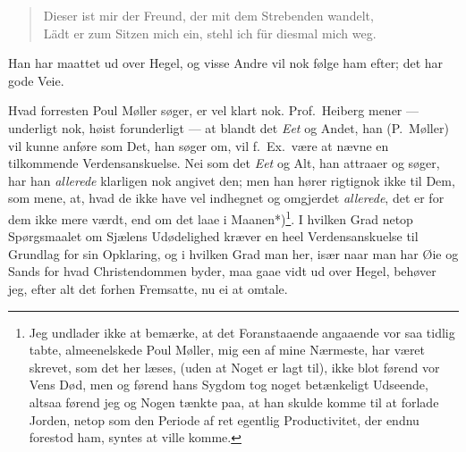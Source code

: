 \documentclass[12pt,a4paper]{book}
\newcommand{\apage}[1]{\marginnote{\footnotesize\textit{[#1]}}}
\begin{document}
\begin{quote}
Dieser ist mir der Freund, der mit dem Strebenden wandelt,\\
\quad Lädt er zum Sitzen mich ein, stehl ich für diesmal mich weg.
\end{quote}

\noindent Han har maattet ud over Hegel, og visse Andre vil nok følge
ham efter; det har gode Veie.

Hvad forresten Poul Møller søger, er vel klart nok. Prof.\ Heiberg
mener --- underligt nok, høist forunderligt --- at blandt det \emph{Eet} og
Andet, han (P.\ Møller) vil kunne anføre som Det, han søger om, vil f.\
Ex.\ være at nævne en tilkommende Verdensanskuelse. Nei som det \emph{Eet} og
Alt, han attraaer og søger, har han \emph{allerede} klarligen nok angivet den;
men han hører \apage{55} rigtignok ikke til Dem, som mene, at, hvad de ikke have
vel indhegnet og omgjerdet \emph{allerede}, det er for dem ikke mere værdt,
end om det laae i Maanen*)\footnote{Jeg undlader ikke at bemærke, at det
Foranstaaende angaaende vor saa tidlig tabte, almeenelskede Poul Møller,
mig een af mine Nærmeste, har været skrevet, som det her læses, (uden at
Noget er lagt til), ikke blot førend vor Vens Død, men og førend hans
Sygdom tog noget betænkeligt Udseende, altsaa førend jeg og Nogen
tænkte paa, at han skulde komme til at forlade Jorden, netop som den
Periode af ret egentlig Productivitet, der endnu forestod ham, syntes
at ville komme.}. I hvilken Grad netop Spørgsmaalet om Sjælens
Udødelighed kræver en heel Verdensanskuelse til Grundlag for sin
Opklaring, og i hvilken Grad man her, især naar man har Øie og Sands
for hvad Christendommen byder, maa gaae vidt ud over Hegel, behøver
jeg, efter alt det forhen Fremsatte, nu ei at omtale.
\end{document}
